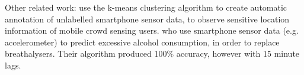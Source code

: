 Other related work: 
\textcite{pius2018automatic} use the k-means clustering algorithm to create automatic annotation of unlabelled smartphone sensor data, to observe sensitive location information of mobile crowd sensing users. \textcite{alcoholCravingPrediction} who use smartphone sensor data (e.g. accelerometer) to predict excessive alcohol consumption, in order to replace breathalysers. Their algorithm produced 100\% accuracy, however with 15 minute lags.